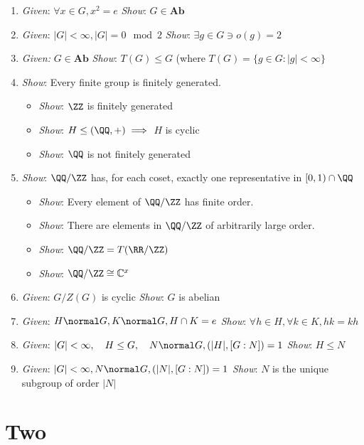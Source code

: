 \begin{enumerate}
\def\labelenumi{\arabic{enumi}.}
\item
  \emph{Given}: \(\forall x \in G, x^2 = e\) \emph{Show}:
  \(G \in \mathbf{Ab}\)
\item
  \emph{Given}: \(|G|<\infty, |G| = 0\mod 2\) \emph{Show}:
  \(\exists g\in G \ni o(g) = 2\)
\item
  \emph{Given:} \(G\in \mathbf{Ab}\) \emph{Show}: \(T(G) \leq G\) (where
  \(T(G) = \{ g\in G : |g| < \infty\}\)
\item
  \emph{Show}: Every finite group is finitely generated.

  \begin{itemize}
  \tightlist
  \item
    \emph{Show}: \(\ZZ\) is finitely generated
  \item
    \emph{Show}: \(H \leq (\QQ, +) \implies\) \(H\) is cyclic
  \item
    \emph{Show}: \(\QQ\) is not finitely generated
  \end{itemize}
\item
  \emph{Show}: \(\QQ/\ZZ\) has, for each coset, exactly one
  representative in \([0, 1) \cap \QQ\)

  \begin{itemize}
  \tightlist
  \item
    \emph{Show}: Every element of \(\QQ/\ZZ\) has finite order.
  \item
    \emph{Show}: There are elements in \(\QQ/\ZZ\) of arbitrarily large
    order.
  \item
    \emph{Show}: \(\QQ/\ZZ = T(\RR/\ZZ)\)
  \item
    \emph{Show}: \(\QQ/\ZZ \cong \mathbb{C}^x\)
  \end{itemize}
\item
  \emph{Given}: \(G/Z(G)\) is cyclic \emph{Show}: \(G\) is abelian
\item
  \emph{Given}: \(H \normal G, K \normal G,H \cap K = e\) \emph{Show}:
  \(\forall h\in H, \forall k\in K, hk = kh\)
\item
  \emph{Given}:
  \(|G| < \infty, \quad H \leq G, \quad N \normal G, (|H|, [G:N]) = 1\)
  \emph{Show}: \(H \leq N\)
\item
  \emph{Given}: \(|G| < \infty, N \normal G, (|N|, [G:N]) =1\)
  \emph{Show}: \(N\) is the unique subgroup of order \(|N|\)
\end{enumerate}

\hypertarget{two}{%
\section{Two}\label{two}}

